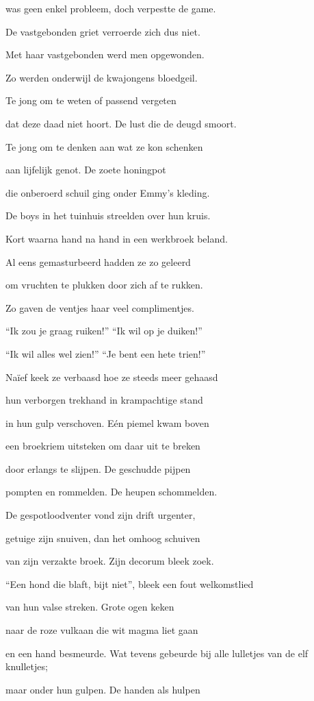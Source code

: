 was geen enkel probleem,
doch verpestte de game.

De vastgebonden griet
verroerde zich dus niet.

Met haar vastgebonden
werd men opgewonden.

Zo werden onderwijl
de kwajongens bloedgeil.

Te jong om te weten
of passend vergeten

dat deze daad niet hoort.
De lust die de deugd smoort.

Te jong om te denken
aan wat ze kon schenken

aan lijfelijk genot.
De zoete honingpot

die onberoerd schuil ging
onder Emmy’s kleding.

De boys in het tuinhuis
streelden over hun kruis.

Kort waarna hand na hand
in een werkbroek beland.

Al eens gemasturbeerd
hadden ze zo geleerd

om vruchten te plukken
door zich af te rukken.

Zo gaven de ventjes
haar veel complimentjes.

“Ik zou je graag ruiken!”
“Ik wil op je duiken!”

“Ik wil alles wel zien!”
“Je bent een hete trien!”

Naïef keek ze verbaasd
hoe ze steeds meer gehaasd

hun verborgen trekhand
in krampachtige stand

in hun gulp verschoven.
Eén piemel kwam boven

een broekriem uitsteken
om daar uit te breken

door erlangs te slijpen.
De geschudde pijpen

pompten en rommelden.
De heupen schommelden.

De gespotloodventer
vond zijn drift urgenter,

getuige zijn snuiven,
dan het omhoog schuiven

van zijn verzakte broek.
Zijn decorum bleek zoek.

“Een hond die blaft, bijt niet”,
bleek een fout welkomstlied

van hun valse streken.
Grote ogen keken

naar de roze vulkaan
die wit magma liet gaan

en een hand besmeurde.
Wat tevens gebeurde
bij alle lulletjes
van de elf knulletjes;

maar onder hun gulpen.
De handen als hulpen

